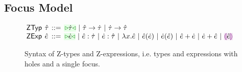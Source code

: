 \begin{subequations}


\end{subequations}
\subsection{Focus Model}\label{sec:cursors}
\begin{figure}[t]
\hspace{-3px}$\arraycolsep=2pt\begin{array}{lllllll}
\mathsf{ZTyp} & \ztau & ::= &
  \zwsel{\htau} ~\vert~
  \tarr{\ztau}{\htau} ~\vert~
  \tarr{\htau}{\ztau} \\
\mathsf{ZExp} & \zexp & ::= &
  \zwsel{\hexp} ~\vert~
  \zexp : \htau ~\vert~
  \hexp : \ztau ~\vert~
  \hlam{x}{\zexp} ~\vert~
  \hap{\zexp}{\hexp} ~\vert~
  \hap{\hexp}{\zexp} ~\vert~
  \hadd{\zexp}{\hexp} ~\vert~
  \hadd{\hexp}{\zexp} ~\vert~
  \hhole{\zexp}
\end{array}$
\caption{Syntax of Z-types and Z-expressions, i.e. types and expressions with holes and a single focus.}
\label{fig:zexp-syntax}
\end{figure}

